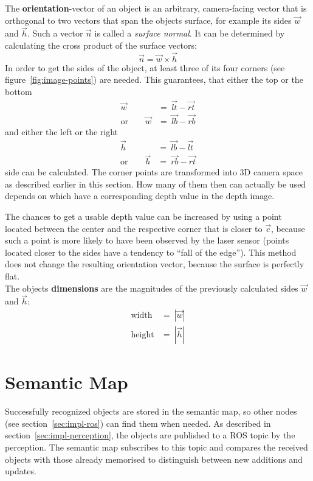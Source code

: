 The \textbf{orientation}-vector of an object is an arbitrary, camera-facing vector that is orthogonal to two vectors that span the objects surface, for example its sides $\overrightarrow{w}$ and $\overrightarrow{h}$. Such a vector $\overrightarrow{n}$ is called a \textit{surface normal}. It can be determined by calculating the cross product of the surface vectors:
\begin{equation*}
  \overrightarrow{n} = \overrightarrow{w} \times \overrightarrow{h}
\end{equation*}
In order to get the sides of the object, at least three of its four corners (see figure~\ref{fig:image-points}) are needed. This guarantees, that either the top or the bottom
\begin{eqnarray*}
                  \overrightarrow{w} &=\ \overrightarrow{lt} - \overrightarrow{rt} \\
  \text{or}\qquad \overrightarrow{w} &=\ \overrightarrow{lb} - \overrightarrow{rb}
\end{eqnarray*}
and either the left or the right
\begin{eqnarray*}
                  \overrightarrow{h} &=\ \overrightarrow{lb} - \overrightarrow{lt} \\
  \text{or}\qquad \overrightarrow{h} &=\ \overrightarrow{rb} - \overrightarrow{rt}
\end{eqnarray*}
side can be calculated. The corner points are transformed into 3D camera space as described earlier in this section. How many of them then can actually be used depends on which have a corresponding depth value in the depth image.

The chances to get a usable depth value can be increased by using a point located between the center and the respective corner that is closer to $\overrightarrow{c}$, because such a point is more likely to have been observed by the laser sensor (points located closer to the sides have a tendency to ``fall of the edge''). This method does not change the resulting orientation vector, because the surface is perfectly flat. \\

The objects \textbf{dimensions} are the magnitudes of the previously calculated sides $\overrightarrow{w}$ and $\overrightarrow{h}$:
\begin{eqnarray*}
  \text{width}  &=\ |\overrightarrow{w}| \\
  \text{height} &=\ |\overrightarrow{h}|
\end{eqnarray*}


\section{Semantic Map}
\label{sec:impl-map}
Successfully recognized objects are stored in the semantic map, so other nodes (see section~\ref{sec:impl-ros}) can find them when needed. As described in section~\ref{sec:impl-perception}, the objects are published to a ROS topic by the perception. The semantic map subscribes to this topic and compares the received objects with those already memorised to distinguish between new additions and updates. \\

